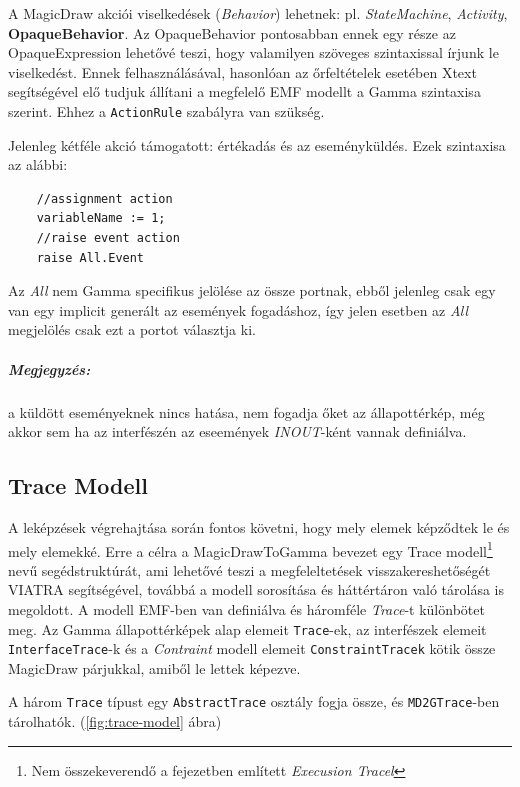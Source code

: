 A MagicDraw akciói viselkedések (\emph{Behavior}) lehetnek: pl. \emph{StateMachine}, \emph{Activity}, \textbf{OpaqueBehavior}. Az OpaqueBehavior pontosabban ennek egy része az OpaqueExpression lehetővé teszi, hogy valamilyen szöveges szintaxissal írjunk le viselkedést. Ennek felhasználásával, hasonlóan az őrfeltételek esetében Xtext segítségével elő tudjuk állítani a megfelelő EMF modellt a Gamma szintaxisa szerint. Ehhez a \verb+ActionRule+ szabályra van szükség.

Jelenleg kétféle akció támogatott: értékadás és az eseményküldés. Ezek szintaxisa az alábbi:

\begin{lstlisting}
	//assignment action
	variableName := 1;
	//raise event action
	raise All.Event
\end{lstlisting}

Az \emph{All} nem Gamma specifikus jelölése az össze portnak, ebből jelenleg csak egy van egy implicit generált az események fogadáshoz, így jelen esetben az \emph{All} megjelölés csak ezt a portot választja ki.

\subparagraph{Megjegyzés:} a küldött eseményeknek nincs hatása, nem fogadja őket az állapottérkép, még akkor sem ha az interfészén az eseemények \emph{INOUT}-ként vannak definiálva.

\subsection{Trace Modell}
\label{sec:trace_model}
A leképzések végrehajtása során fontos követni, hogy mely elemek képződtek le és mely elemekké. Erre a célra a MagicDrawToGamma bevezet egy Trace modell\footnote{Nem összekeverendő a  fejezetben említett \emph{Execusion Tracel}} nevű segédstruktúrát, ami lehetővé teszi a megfeleltetések visszakereshetőségét VIATRA segítségével, továbbá a modell sorosítása és háttértáron való tárolása is megoldott. A modell EMF-ben van definiálva és  háromféle \emph{Trace}-t különbötet meg. Az Gamma állapottérképek alap elemeit \verb+Trace+-ek, az interfészek elemeit \verb+InterfaceTrace+-k és a \emph{Contraint} modell elemeit \verb+ConstraintTracek+ kötik össze MagicDraw párjukkal, amiből le lettek képezve.

A három \verb+Trace+ típust egy \verb+AbstractTrace+ osztály fogja össze, és \verb+MD2GTrace+-ben tárolhatók. (\ref{fig:trace-model} ábra)

